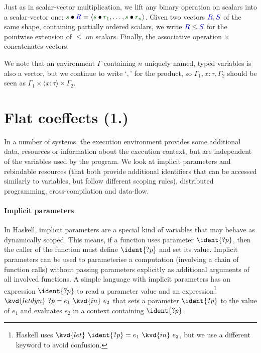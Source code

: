 Just as in scalar-vector multiplication, we lift any binary operation on scalars into a scalar-vector one:
$\cclrd{s} \bullet \aclrd{R} = \langle \cclrd{s}\bullet\cclrd{r_1}, \ldots, \cclrd{s}\bullet\cclrd{r_n}\rangle$.
Given two vectors $\aclrd{R},\aclrd{S}$ of the same shape, containing partially ordered scalars, we 
write $\aclrd{R} \leq \aclrd{S}$ for the pointwise extension of $\leq$ on scalars. Finally,
the associative operation $\times$ concatenates vectors.

We note that an environment $\Gamma$ containing $n$ uniquely named, typed variables is also a vector, 
but we continue to write `$,$' for the product, so $\Gamma_1, x\!:\!\tau, \Gamma_2$ should 
be seen as $\Gamma_1 \times \langle x\!:\!\tau\rangle \times \Gamma_2$.


\section{Flat coeffects (1.)}

In a number of systems, the execution environment provides some additional data, resources or 
information about the execution context, but are independent of the variables used by the 
program. We look at implicit parameters and rebindable resources (that both provide additional
identifiers that can be accessed similarly to variables, but follow different scoping rules),
distributed programming, cross-compilation and data-flow.


\paragraph{Implicit parameters} In Haskell, implicit parameters \cite{app-implicit-parameters} are 
a special kind of variables that may behave as dynamically scoped. This means, if a function uses 
parameter $\ident{?p}$, then the caller of the function must define $\ident{?p}$ and set its value.
Implicit parameters can be used to parameterise a computation (involving a chain of function calls)
without passing parameters explicitly as additional arguments of all involved functions. A simple 
language with implicit parameters has an expression $\ident{?p}$ to read a parameter value and an 
expression\footnote{Haskell uses $\kvd{let}~\ident{?p} = e_1~\kvd{in}~e_2$, but we use a different keyword to 
avoid confusion.} $\kvd{letdyn}~?p = e_1~\kvd{in}~e_2$ that sets a parameter $\ident{?p}$ to the value of $e_1$ 
and evaluates $e_2$ in a context containing $\ident{?p}$

